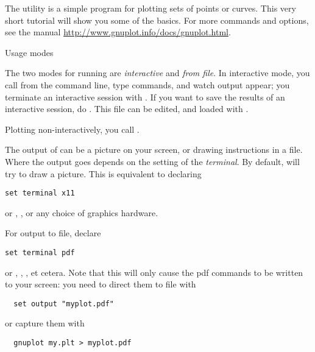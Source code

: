 
The  utility is a
simple program for plotting sets of points or curves. This very short
tutorial will show you some of the basics. For more commands and
options, see the manual
\url{http://www.gnuplot.info/docs/gnuplot.html}.

 {Usage modes}

The two modes for running  are \emph{interactive} and
\emph{from file}. In interactive mode, you call  from the
command line, type commands, and watch output appear; you terminate an
interactive session with .  If you want to save the results of
an interactive session, do . This file can be
edited, and loaded with .

Plotting non-interactively, you call .

The output of  can be a picture on your screen, or drawing
instructions in a file. Where the output goes depends on the setting
of the \emph{terminal}. By default,  will try to draw a
picture. This is equivalent to declaring
\begin{verbatim}
set terminal x11
\end{verbatim}
or , , or any choice of graphics hardware.

For output to file, declare
\begin{verbatim}
set terminal pdf
\end{verbatim}
or , , , et cetera. Note that this will only
cause the pdf commands to be written to your screen: you need to
direct them to file with
\begin{verbatim}
  set output "myplot.pdf"
\end{verbatim}
or capture them with
\begin{verbatim}
  gnuplot my.plt > myplot.pdf
\end{verbatim}

